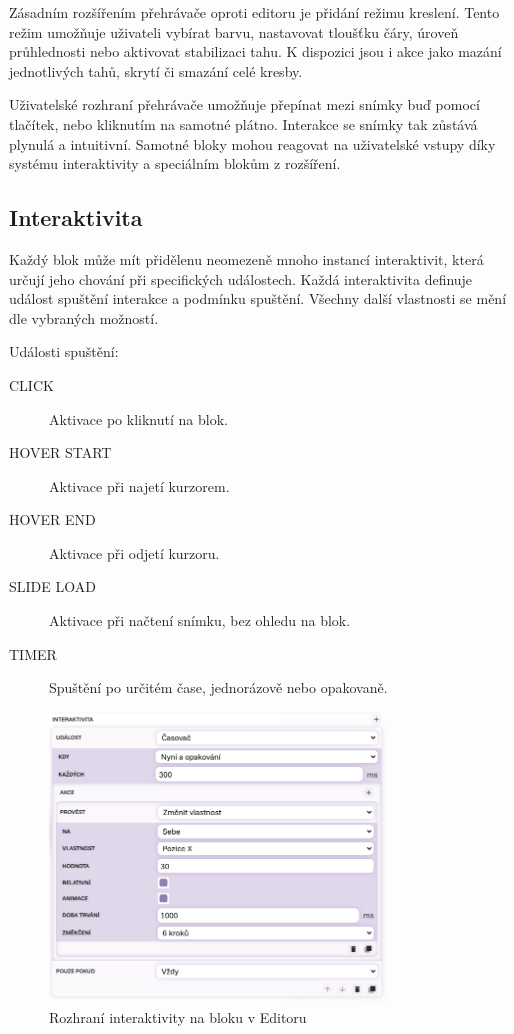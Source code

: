Zásadním rozšířením přehrávače oproti editoru je přidání režimu kreslení. 
Tento režim umožňuje uživateli vybírat barvu, nastavovat tloušťku čáry, úroveň průhlednosti nebo aktivovat stabilizaci tahu. 
K dispozici jsou i akce jako mazání jednotlivých tahů, skrytí či smazání celé kresby.

Uživatelské rozhraní přehrávače umožňuje přepínat mezi snímky buď pomocí tlačítek, nebo kliknutím na samotné plátno.
Interakce se snímky tak zůstává plynulá a intuitivní. 
Samotné bloky mohou reagovat na uživatelské vstupy díky systému interaktivity a speciálním blokům z rozšíření.

\subsection{Interaktivita}

Každý blok může mít přidělenu neomezeně mnoho instancí interaktivit, která určují jeho chování při specifických událostech. 
Každá interaktivita definuje událost spuštění interakce a podmínku spuštění.
Všechny další vlastnosti se mění dle vybraných možností.

Události spuštění:
\begin{description}
  \item[CLICK] Aktivace po kliknutí na blok.
  \item[HOVER START] Aktivace při najetí kurzorem.
  \item[HOVER END] Aktivace při odjetí kurzoru.
  \item[SLIDE LOAD] Aktivace při načtení snímku, bez ohledu na blok.
  \item[TIMER] Spuštění po určitém čase, jednorázově nebo opakovaně.
\end{description}


\begin{figure}[ht!]
    \centering
    \includegraphics[width=0.8\textwidth]{media/05_realizace/interaktivita.png}
    \caption{Rozhraní interaktivity na bloku v Editoru}
    \label{fig:interaktivita}
\end{figure}


